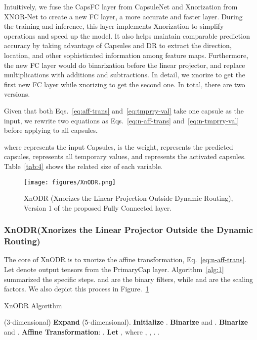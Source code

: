 \documentclass[sn-mathphys,iicol,Numbered]{sn-jnl}
\begin{document}
Intuitively, we fuse the CapsFC layer from CapsuleNet and Xnorization from XNOR-Net to create a new FC layer, a more accurate and faster layer. During the training and inference, this layer implements Xnorization to simplify operations and speed up the model. It also helps maintain comparable prediction accuracy by taking advantage of Capsules and DR to extract the direction, location, and other sophisticated information among feature maps. Furthermore, the new FC layer would do binarization before the linear projector, and replace multiplications with additions and subtractions. In detail, we xnorize  to get the first new FC layer while xnorizing  to get the second one. In total, there are two versions.

Given that both Eqs.~\ref{eq:aff-trans} and~\ref{eq:tmprry-val} take one capsule as the input, we rewrite two equations as Eqs.~\ref{eq:n-aff-trans} and~\ref{eq:n-tmprry-val} before applying to all capsules.

\vspace{-0.3cm}

where  represents the input Capsules,  is the weight,  represents the predicted capsules,  represents all temporary values, and  represents the activated capsules. Table~\ref{tab:4} shows the related size of each variable.

\begin{figure} [ht]
\centering
\caption{XnODR (Xnorizes the Linear Projection Outside Dynamic Routing), Version 1 of the proposed Fully Connected layer.}
\texttt{[image: figures/XnODR.png]}
\label{fig:XnODR}
\vspace{-0.7cm}
\end{figure}

\subsubsection{XnODR(Xnorizes the Linear Projector Outside the Dynamic Routing)} \label{sec:3.3.1} 

The core of XnODR is to xnorize the affine transformation, Eq.~\ref{eq:n-aff-trans}. Let  denote output tensors from the PrimaryCap layer. Algorithm~\ref{alg:1} summarized the specific steps.  and  are the binary filters, while  and  are the scaling factors. We also depict this process in Figure.~\ref{fig:XnODR}

\begin{algorithm}[ht]\small
\caption{XnODR Algorithm}
\begin{algorithmic}[1]
\INPUT  (3-dimensional)
\OUTPUT 
\State  \textbf{Expand}  (5-dimensional).
\State \textbf{Initialize} .
\State \textbf{Binarize}    and .
\State \textbf{Binarize}    and . 
\State \textbf{Affine Transformation}:
.
\State \textbf{Let} , where , , . 
\State .
\end{algorithmic}
\label{alg:1}
\end{algorithm}
\end{document}

